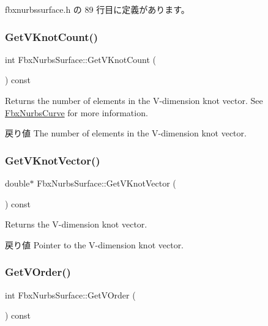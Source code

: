  fbxnurbssurface.\+h の 89 行目に定義があります。

\mbox{\label{class_fbx_nurbs_surface_aa1776426c0e8b230c302d9c90b0244f9}} 
\subsubsection{\texorpdfstring{Get\+V\+Knot\+Count()}{GetVKnotCount()}}
{\footnotesize\ttfamily int Fbx\+Nurbs\+Surface\+::\+Get\+V\+Knot\+Count (\begin{DoxyParamCaption}{ }\end{DoxyParamCaption}) const}

Returns the number of elements in the V-\/dimension knot vector. See \hyperlink{class_fbx_nurbs_curve}{Fbx\+Nurbs\+Curve} for more information. \begin{DoxyReturn}{戻り値}
The number of elements in the V-\/dimension knot vector. 
\end{DoxyReturn}
\mbox{\label{class_fbx_nurbs_surface_ac12a9bb5194931ba8be016dd0d309e9f}} 
\subsubsection{\texorpdfstring{Get\+V\+Knot\+Vector()}{GetVKnotVector()}}
{\footnotesize\ttfamily double$\ast$ Fbx\+Nurbs\+Surface\+::\+Get\+V\+Knot\+Vector (\begin{DoxyParamCaption}{ }\end{DoxyParamCaption}) const}

Returns the V-\/dimension knot vector. \begin{DoxyReturn}{戻り値}
Pointer to the V-\/dimension knot vector. 
\end{DoxyReturn}
\mbox{\label{class_fbx_nurbs_surface_a9727565bce4253b1d44e2fcd3a712f7b}} 
\subsubsection{\texorpdfstring{Get\+V\+Order()}{GetVOrder()}}
{\footnotesize\ttfamily int Fbx\+Nurbs\+Surface\+::\+Get\+V\+Order (\begin{DoxyParamCaption}{ }\end{DoxyParamCaption}) const\hspace{0.3cm}{\ttfamily [inline]}}

